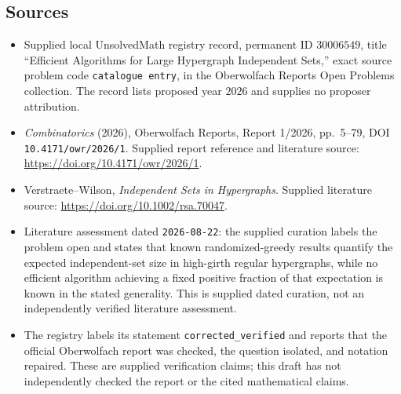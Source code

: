 \documentclass[11pt]{article}
\begin{document}
\subsection{Sources}
\begin{itemize}
\item Supplied local UnsolvedMath registry record, permanent ID \(30006549\), title ``Efficient Algorithms for Large Hypergraph Independent Sets,'' exact source problem code \texttt{catalogue entry}, in the Oberwolfach Reports Open Problems collection. The record lists proposed year \(2026\) and supplies no proposer attribution.
\item \emph{Combinatorics} (2026), Oberwolfach Reports, Report 1/2026, pp.~5--79, DOI \texttt{10.4171/owr/2026/1}. Supplied report reference and literature source: \url{https://doi.org/10.4171/owr/2026/1}.
\item Verstraete--Wilson, \emph{Independent Sets in Hypergraphs}. Supplied literature source: \url{https://doi.org/10.1002/rsa.70047}.
\item Literature assessment dated \texttt{2026-08-22}: the supplied curation labels the problem open and states that known randomized-greedy results quantify the expected independent-set size in high-girth regular hypergraphs, while no efficient algorithm achieving a fixed positive fraction of that expectation is known in the stated generality. This is supplied dated curation, not an independently verified literature assessment.
\item The registry labels its statement \texttt{corrected\_verified} and reports that the official Oberwolfach report was checked, the question isolated, and notation repaired. These are supplied verification claims; this draft has not independently checked the report or the cited mathematical claims.
\end{itemize}
\end{document}
